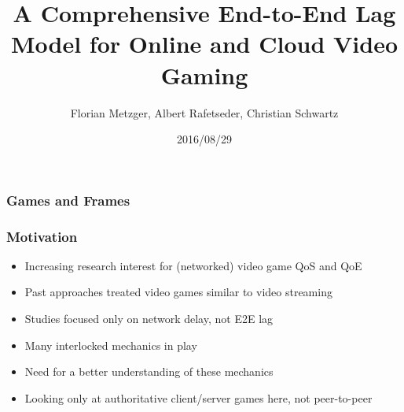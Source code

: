 \documentclass{UDEbeamerEN}
\title{A Comprehensive End-to-End Lag Model for Online and Cloud Video Gaming}
\author{Florian Metzger, Albert Rafetseder, Christian Schwartz}
\date[]{2016/08/29}
\begin{document}
\frame{\titlepage}




\begin{frame}
	\frametitle{Games and Frames}
	\vspace{-0.5cm}





	\begin{overprint}
	\end{overprint}
\end{frame}

\begin{frame}
	\frametitle{Motivation}

	\begin{itemize}
		\item Increasing research interest for (networked) video game QoS and QoE
		\item Past approaches treated video games similar to video streaming
		\item Studies focused only on network delay, not E2E lag
		\item Many interlocked mechanics in play
		\item Need for a better understanding of these mechanics
		\item Looking only at authoritative client/server games here, not peer-to-peer
	\end{itemize}

\end{frame}
\end{document}
